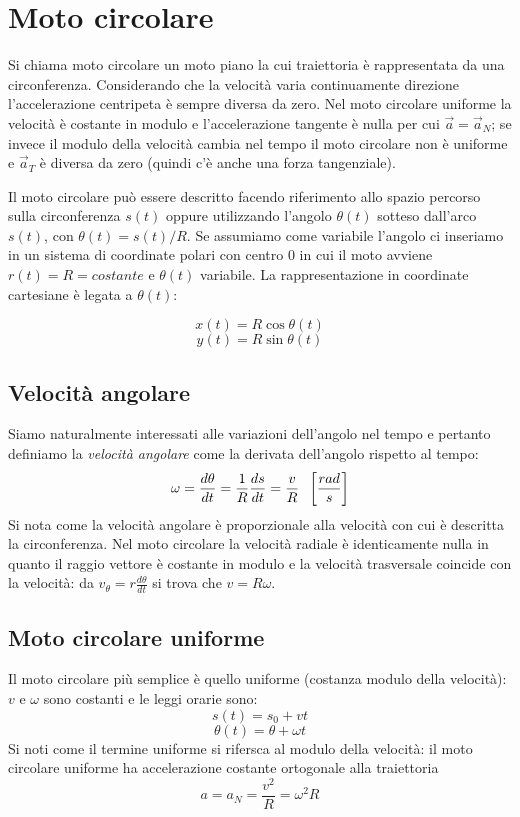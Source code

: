 \documentclass[class=book, crop=false, oneside, 12pt]{standalone}
\begin{document}
\section{Moto circolare}
Si chiama moto circolare un moto piano la cui traiettoria è rappresentata da una circonferenza.
Considerando che la velocità varia continuamente direzione l'accelerazione centripeta è sempre diversa da zero.
Nel moto circolare uniforme la velocità è costante in modulo e l'accelerazione tangente è nulla per cui \(\overrightarrow{a} = \overrightarrow{a}_N\);
se invece il modulo della velocità cambia nel tempo il moto circolare non è uniforme e \(\overrightarrow{a}_T\) è diversa da zero (quindi c'è anche una forza tangenziale).

Il moto circolare può essere descritto facendo riferimento allo spazio percorso sulla circonferenza \(s(t)\) oppure
utilizzando l'angolo \(\theta (t)\) sotteso dall'arco \(s(t)\), con \(\theta(t) = s(t)/R\).
Se assumiamo come variabile l'angolo ci inseriamo in un sistema di coordinate polari con centro \(0\) in cui il moto avviene \(r(t) = R = costante\) e \(\theta(t)\) variabile.
La rappresentazione in coordinate cartesiane \`e legata a $\theta(t)$:
\begin{multicols}{2}
  \noindent
  $$x(t)=R\cos\theta(t)$$
  $$y(t)=R\sin\theta(t)$$
\end{multicols}
  \subsection{Velocit\`a angolare}
  Siamo naturalmente interessati alle variazioni dell'angolo nel tempo e pertanto definiamo la \emph{velocità angolare} come la derivata dell'angolo rispetto al tempo:
  \begin{equation}
   \omega = \frac{d \theta}{dt} = \frac{1}{R} \frac {ds} {dt} = \frac{v}{R} \hspace{0.2cm} \left[\frac{rad}{s}\right]
  \end{equation}
	Si nota come la velocit\`a angolare \`e proporzionale alla velocit\`a con cui \`e descritta la circonferenza.
	Nel moto circolare la velocit\`a radiale \`e identicamente nulla in quanto il raggio vettore \`e costante in modulo e la velocit\`a trasversale coincide con la velocit\`a: da $v_\theta=r\frac{d\theta}{dt}$ si trova che $v=R\omega$.
  \subsection{Moto circolare uniforme}
  Il moto circolare più semplice è quello uniforme (costanza modulo della velocità): \(v\) e \(\omega\) sono costanti e le leggi orarie sono:
  \begin{equation}
    s(t) = s_0 + vt
  \end{equation}
  \begin{equation}
    \theta(t) = \theta + \omega t
  \end{equation}
  Si noti come il termine uniforme si rifersca al modulo della velocit\`a: il moto circolare uniforme ha accelerazione costante ortogonale alla traiettoria
  \begin{equation}
   a = a_N = \frac{v^2}{R} = \omega^2 R
  \end{equation}
\end{document}
